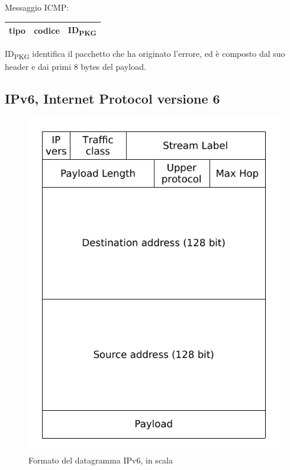 \documentclass[12pt,a4paper]{article}
\begin{document}
Messaggio ICMP:
\begin{tabular}{| c | c | c |}\hline
  tipo  & codice  & ID\textsubscript{PKG} \\ \hline
\end{tabular}

ID\textsubscript{PKG} identifica il pacchetto che ha originato l'errore,
ed è composto dal suo header e dai primi 8 bytes del payload.

\subsection{IPv6, Internet Protocol versione 6}
\begin{figure}[H]
\centering
\includegraphics{img/3/ipv6-head.pdf}
\caption{Formato del datagramma IPv6, in scala}
\end{figure}
\end{document}
